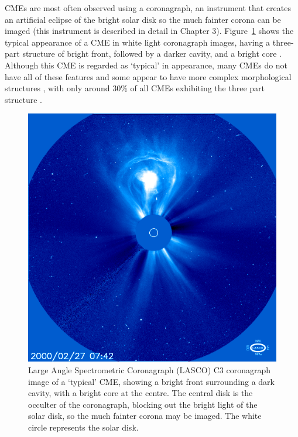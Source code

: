 CMEs are most often observed using a coronagraph, an instrument that creates an artificial eclipse of the bright solar disk so the much fainter corona can be imaged (this instrument is described in detail in Chapter 3). Figure~\ref{fig:lasco_c3} shows the typical appearance of a CME in white light coronagraph images, having a three-part structure of bright front, followed by a darker cavity, and a bright core \citep{illing1985}. Although this CME is regarded as \textquoteleft typical' in appearance, many CMEs do not have all of these features and some appear to have more complex morphological structures \citep{pick2006}, with only around 30\% of all CMEs exhibiting the three part structure \citep{webbHu1987}. 
\begin{figure}[t!]
\begin{center}
\includegraphics[scale=0.45]{images/lasco_c3}
\caption[LASCO C3 image of a CME]{Large Angle Spectrometric Coronagraph (LASCO) C3 coronagraph image of a \textquoteleft typical' CME, showing  a bright front surrounding a dark cavity, with a bright core at the centre. The central disk is the occulter of the coronagraph, blocking out the bright light of the solar disk, so the much fainter corona may be imaged. The white circle represents the solar disk.}
\label{fig:lasco_c3}
\end{center}
\end{figure}

